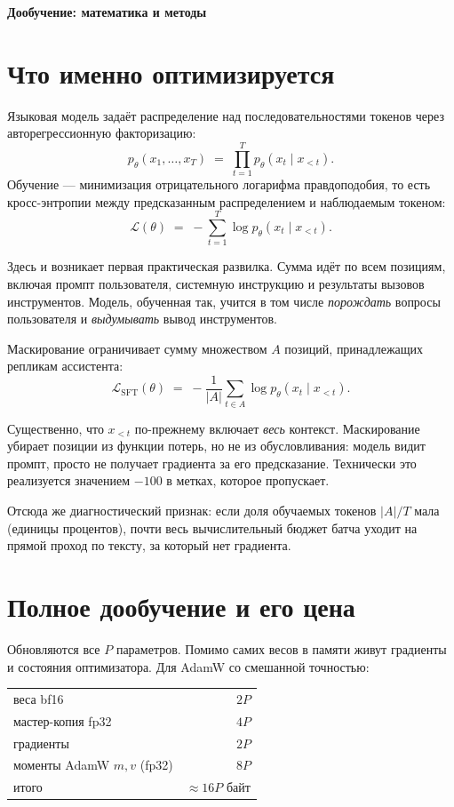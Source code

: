 \documentclass[11pt,a4paper]{article}
\begin{document}
{\Large\bfseries Дообучение: математика и методы}

\vspace{-0.5em}

\section{Что именно оптимизируется}

Языковая модель задаёт распределение над последовательностями токенов
через авторегрессионную факторизацию:
\[
p_\theta(x_1,\dots,x_T) \;=\; \prod_{t=1}^{T} p_\theta(x_t \mid x_{<t}).
\]
Обучение — минимизация отрицательного логарифма правдоподобия, то есть
кросс-энтропии между предсказанным распределением и наблюдаемым токеном:
\[
\mathcal{L}(\theta) \;=\; -\sum_{t=1}^{T} \log p_\theta(x_t \mid x_{<t}).
\]

Здесь и возникает первая практическая развилка. Сумма идёт по всем
позициям, включая промпт пользователя, системную инструкцию и результаты
вызовов инструментов. Модель, обученная так, учится в том числе
\emph{порождать} вопросы пользователя и \emph{выдумывать} вывод
инструментов.

Маскирование ограничивает сумму множеством $A$ позиций, принадлежащих
репликам ассистента:
\[
\mathcal{L}_{\text{SFT}}(\theta) \;=\; -\frac{1}{|A|}\sum_{t \in A}
\log p_\theta(x_t \mid x_{<t}).
\]

\begin{keybox}
Существенно, что $x_{<t}$ по-прежнему включает \emph{весь} контекст.
Маскирование убирает позиции из функции потерь, но не из обусловливания:
модель видит промпт, просто не получает градиента за его предсказание.
Технически это реализуется значением $-100$ в метках, которое
 пропускает.
\end{keybox}

Отсюда же диагностический признак: если доля обучаемых токенов
$|A|/T$ мала (единицы процентов), почти весь вычислительный бюджет
батча уходит на прямой проход по тексту, за который нет градиента.

\section{Полное дообучение и его цена}

Обновляются все $P$ параметров. Помимо самих весов в памяти живут
градиенты и состояния оптимизатора. Для AdamW со смешанной точностью:

\begin{center}
\begin{tabular}{@{}lr@{}}
\toprule
веса bf16 & $2P$ \\
мастер-копия fp32 & $4P$ \\
градиенты & $2P$ \\
моменты AdamW $m,v$ (fp32) & $8P$ \\
\midrule
итого & $\approx 16P$ байт \\
\bottomrule
\end{tabular}
\end{center}
\end{document}
